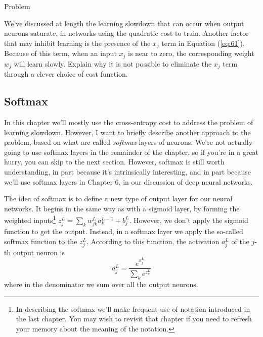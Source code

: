 \documentclass[a4paper,twoside,10pt]{book}
\begin{document}
\begin{exercize}{Problem}
	\item We've discussed at length the learning slowdown that can occur when output neurons saturate, in networks using the quadratic cost to train. Another factor that may inhibit learning is the presence of the $x_j$ term in Equation (\ref{eq:61}). Because of this term, when an input $x_j$ is near to zero, the corresponding weight $w_j$ will learn slowly. Explain why it is not possible to eliminate the $x_j$ term through a clever choice of cost function.
\end{exercize}

\subsection{Softmax}
In this chapter we'll mostly use the cross-entropy cost to address the problem of learning slowdown. However, I want to briefly describe another approach to the problem, based on what are called \textit{softmax} layers of neurons. We're not actually going to use softmax layers in the remainder of the chapter, so if you're in a great hurry, you can skip to the next section. However, softmax is still worth understanding, in part because it's intrinsically interesting, and in part because we'll use softmax layers in Chapter 6, in our discussion of deep neural networks.

The idea of softmax is to define a new type of output layer for our neural networks. It begins in the same way as with a sigmoid layer, by forming the weighted inputs\footnote{In describing the softmax we'll make frequent use of notation introduced in the last chapter. You may wish to revisit that chapter if you need to refresh your memory about the meaning of the notation.} $z^L_j=\sum_kw^L_{jk}a^{L−1}_k+b^L_j$. However, we don't apply the sigmoid function to get the output. Instead, in a softmax layer we apply the so-called softmax function to the $z^L_j$. According to this function, the activation $a^L_j$ of the $j$-th output neuron is
\begin{equation}
	a^L_j = \frac{e^{x^L_j}}{\sum_ke^{z^L_k}}
	\label{eq:78}
\end{equation}
where in the denominator we sum over all the output neurons.
\end{document}
